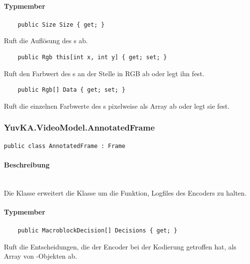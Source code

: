 \paragraph{Typmember}
\begin{itemize}

	\begin{verbatim}
	public Size Size { get; }
	\end{verbatim}
	Ruft die Auflösung des s ab.

	\begin{verbatim}
	public Rgb this[int x, int y] { get; set; }
	\end{verbatim}
	Ruft den Farbwert des s an der Stelle  in RGB ab oder legt ihn fest.

	\begin{verbatim}
	public Rgb[] Data { get; set; }
	\end{verbatim}
	Ruft die einzelnen Farbwerte des s pixelweise als Array ab oder legt sie fest.

\end{itemize}

\subsubsection{YuvKA.VideoModel.AnnotatedFrame}

\begin{verbatim}
public class AnnotatedFrame : Frame
\end{verbatim}

\paragraph{Beschreibung}~\\
Die Klasse  erweitert die Klasse  um die Funktion, Logfiles des Encoders zu halten.

\paragraph{Typmember}
\begin{itemize}

	\begin{verbatim}
	public MacroblockDecision[] Decisions { get; }
	\end{verbatim}
	Ruft die Entscheidungen, die der Encoder bei der Kodierung getroffen hat, als Array von -Objekten ab.

\end{itemize}

